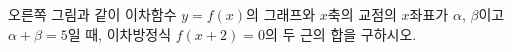 \noindent\begin{minipage}[t]{0.58\linewidth}\vspace{0pt}\raggedright 오른쪽 그림과 같이 이차함수 $y=f(x)$의 그래프와 $x$축의 교점의 $x$좌표가 $\alpha$, $\beta$이고 $\alpha+\beta=5$일 때, 이차방정식 $f(x+2)=0$의 두 근의 합을 구하시오.\end{minipage}\hfill\begin{minipage}[t]{0.4\linewidth}\vspace{0pt}\centering \resizebox{\ifdim\width>\linewidth\linewidth\else\width\fi}{!}{}\end{minipage}\par
